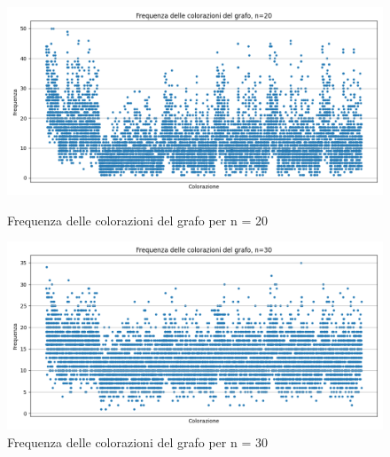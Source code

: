 \documentclass{article}
\begin{document}
\begin{figure}[!ht]
    \centering
    \begin{minipage}{0.45\textwidth}
        \centering
        \includegraphics[width=\linewidth]{img/grafico_frequenza_colorazioni_n20.png}
        \caption{Frequenza delle colorazioni del grafo per n = 20}
        \label{fig:immagine1}
    \end{minipage}\hfill
    \begin{minipage}{0.45\textwidth}
        \centering
        \includegraphics[width=\linewidth]{img/grafico_frequenza_colorazioni_n30.png}
        \caption{Frequenza delle colorazioni del grafo per n = 30}
        \label{fig:immagine2}
    \end{minipage}
\end{figure}
\end{document}
